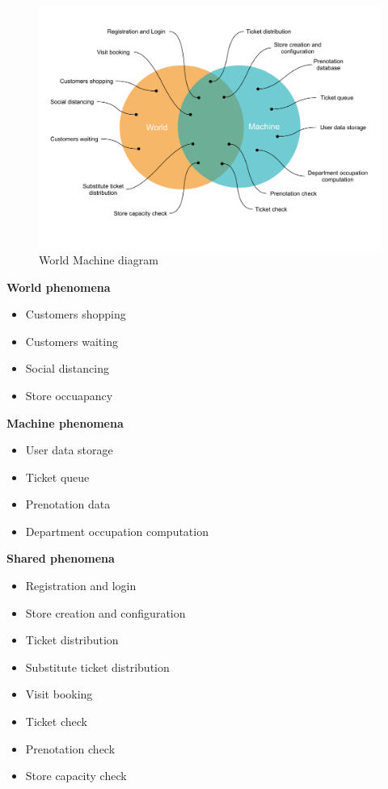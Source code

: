 \begin{figure}[h]
    \centering
    \includegraphics[width=.85\textwidth]{Images/world-machine.pdf}
    \caption{\label{fig:world_machine} World Machine diagram}
\end{figure}

\textbf{World phenomena}
\begin{itemize}
    \item Customers shopping
    \item Customers waiting
    \item Social distancing
    \item Store occuapancy
\end{itemize}

\textbf{Machine phenomena}
\begin{itemize}
    \item User data storage
    \item Ticket queue
    \item Prenotation data
    \item Department occupation computation
\end{itemize}

\textbf{Shared phenomena}
\begin{itemize}
    \item Registration and login
    \item Store creation and configuration
    \item Ticket distribution
    \item Substitute ticket distribution
    \item Visit booking
    \item Ticket check
    \item Prenotation check
    \item Store capacity check
\end{itemize}


